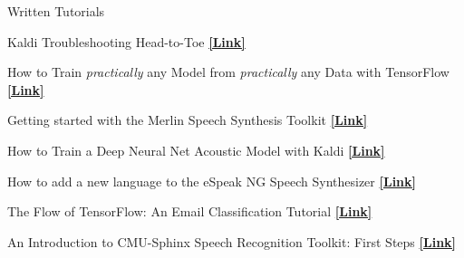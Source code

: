 \documentclass{resume} %
\begin{document}




\begin{minipage}{\textwidth}
\begin{rSection}{Written Tutorials}
\vspace{.25cm}

{Kaldi Troubleshooting Head-to-Toe} \hfill \href{http://jrmeyer.github.io/asr/2019/08/17/Kaldi-troubleshooting.html}{\textbf{[Link]}}%

\vspace{.25cm}

{How to Train \textit{practically} any Model from \textit{practically} any Data with TensorFlow} \hfill \href{http://jrmeyer.github.io/machinelearning/2019/05/29/tensorflow-dataset-estimator-api.html}{\textbf{[Link]}}%

\vspace{.25cm}

{Getting started with the Merlin Speech Synthesis Toolkit} \hfill \href{http://jrmeyer.github.io/tts/2017/02/14/Installing-Merlin.html}{\textbf{[Link]}}%
\vspace{.25cm}

{How to Train a Deep Neural Net Acoustic Model with Kaldi} \hfill \href{http://jrmeyer.github.io/asr/2016/12/15/DNN-AM-Kaldi.html}{\textbf{[Link]}}%
\vspace{.25cm}

{How to add a new language to the eSpeak NG Speech Synthesizer} \hfill \href{http://jrmeyer.github.io/tts/2016/07/03/How-to-Add-a-Language-to-eSpeak-NG.html}{\textbf{[Link]}}%
\vspace{.25cm}

{The Flow of TensorFlow: An Email Classification Tutorial} \hfill \href{http://jrmeyer.github.io/machinelearning/2016/02/01/TensorFlow-Tutorial.html}{\textbf{[Link]}}%
\vspace{.25cm}

{An Introduction to CMU-Sphinx Speech Recognition Toolkit: First Steps} \hfill \href{http://jrmeyer.github.io/asr/2016/01/09/Installing-CMU-Sphinx-on-Ubuntu.html}{\textbf{[Link]}}%

\end{rSection}
\end{minipage}
\end{document}
